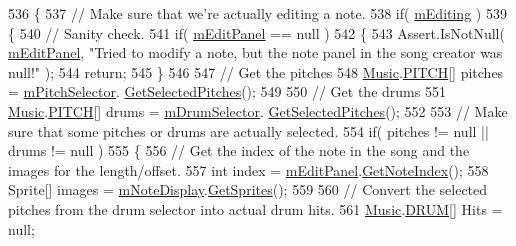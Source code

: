 \begin{DoxyCode}
536     \{
537         \textcolor{comment}{// Make sure that we're actually editing a note.}
538         \textcolor{keywordflow}{if}( \hyperlink{group___s_c_m_priv_var_gad2a61787c63fb8770d3c8100adfae9cf}{mEditing} )
539         \{
540             \textcolor{comment}{// Sanity check.}
541             \textcolor{keywordflow}{if}( \hyperlink{group___s_c_m_priv_var_gad063b650cf7112be19edaf1a2033ea4d}{mEditPanel} == null )
542             \{
543                 Assert.IsNotNull( \hyperlink{group___s_c_m_priv_var_gad063b650cf7112be19edaf1a2033ea4d}{mEditPanel}, \textcolor{stringliteral}{"Tried to modify a note, but the note panel in the
       song creator was null!"} );
544                 \textcolor{keywordflow}{return};
545             \}
546 
547             \textcolor{comment}{// Get the pitches }
548             \hyperlink{class_music}{Music}.\hyperlink{group___music_enums_ga508f69b199ea518f935486c990edac1d}{PITCH}[] pitches = \hyperlink{group___s_c_m_priv_var_gab84821120cace4099edfb42c52d2af63}{mPitchSelector}.
      \hyperlink{group___s_c___p_s_c_pub_func_ga05750cc6e1199f1522f8b87d6579dc34}{GetSelectedPitches}();
549 
550             \textcolor{comment}{// Get the drums}
551             \hyperlink{class_music}{Music}.\hyperlink{group___music_enums_ga508f69b199ea518f935486c990edac1d}{PITCH}[] drums = \hyperlink{group___s_c_m_priv_var_gac8be873b8259a0ddf76b4fa6d7d2d072}{mDrumSelector}.
      \hyperlink{group___s_c___p_s_c_pub_func_ga05750cc6e1199f1522f8b87d6579dc34}{GetSelectedPitches}();
552 
553             \textcolor{comment}{// Make sure that some pitches or drums are actually selected.}
554             \textcolor{keywordflow}{if}( pitches != null || drums != null )
555             \{
556                 \textcolor{comment}{// Get the index of the note in the song and the images for the length/offset.}
557                 \textcolor{keywordtype}{int} index = \hyperlink{group___s_c_m_priv_var_gad063b650cf7112be19edaf1a2033ea4d}{mEditPanel}.\hyperlink{group___s_c___n_d_p_unity_ga8beef050026ade4ba4ccb574c414d24e}{GetNoteIndex}();
558                 Sprite[] images = \hyperlink{group___s_c_m_priv_var_ga308f19d1b2020fc625c12dd08ee16b1c}{mNoteDisplay}.\hyperlink{group___s_c___n_d_c_pub_func_ga3cdbb1068cd6511112c564fc636c56ca}{GetSprites}();
559 
560                 \textcolor{comment}{// Convert the selected pitches from the drum selector into actual drum hits.}
561                 \hyperlink{class_music}{Music}.\hyperlink{group___music_enums_gade475b4382c7066d1af13e7c13c029b6}{DRUM}[] Hits = null;

\end{DoxyCode}
